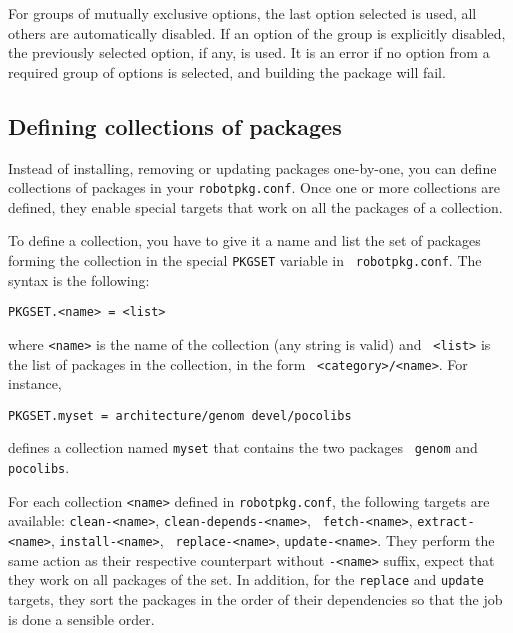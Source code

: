 For groups of mutually exclusive options, the last option selected is used, all
others are automatically  disabled.  If  an option of  the  group is explicitly
disabled, the previously selected option,  if any, is used.   It is an error if
no option from  a  required group  of  options is  selected, and  building  the
package will fail.


\subsection{Defining collections of packages} %

Instead of installing, removing or updating packages one-by-one, you can define
collections  of  packages  in  your  {\tt  robotpkg.conf}.  Once  one  or  more
collections  are defined,  they enable  special targets  that work  on  all the
packages of a collection.

To define a collection, you have to give it a name and list the set of packages
forming  the  collection   in  the  special  {\tt  PKGSET}   variable  in  {\tt
robotpkg.conf}. The syntax is the following:

\begin{verbatim}
PKGSET.<name> = <list>
\end{verbatim}

where {\tt <name>} is the name of the collection (any string is valid) and {\tt
<list>}  is  the  list  of  packages  in  the  collection,  in  the  form  {\tt
<category>/<name>}. For instance,

\begin{verbatim}
PKGSET.myset = architecture/genom devel/pocolibs
\end{verbatim}

defines  a collection named  {\tt myset}  that contains  the two  packages {\tt
genom} and {\tt pocolibs}.

For each collection {\tt <name>}  defined in {\tt robotpkg.conf}, the following
targets  are available:  {\tt clean-<name>},  {\tt  clean-depends-<name>}, {\tt
fetch-<name>},    {\tt     extract-<name>},    {\tt    install-<name>},    {\tt
replace-<name>},  {\tt update-<name>}. They  perform the  same action  as their
respective counterpart without  {\tt -<name>} suffix, expect that  they work on
all packages  of the set. In addition,  for the {\tt replace}  and {\tt update}
targets, they sort the packages in  the order of their dependencies so that the
job is done a sensible order.


